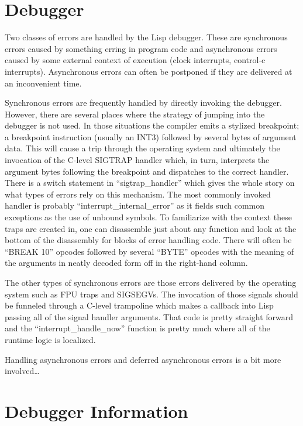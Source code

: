 \chapter{Debugger}
Two classes of errors are handled by the Lisp debugger.  These are
synchronous errors caused by something erring in program code and
asynchronous errors caused by some external context of execution
(clock interrupts, control-c interrupts).  Asynchronous errors can
often be postponed if they are delivered at an inconvenient time.

Synchronous errors are frequently handled by directly invoking the
debugger.  However, there are several places where the strategy of
jumping into the debugger is not used.  In those situations the
compiler emits a stylized breakpoint; a breakpoint instruction
(usually an INT3) followed by several bytes of argument data.  This
will cause a trip through the operating system and ultimately the
invocation of the C-level SIGTRAP handler which, in turn, interprets
the argument bytes following the breakpoint and dispatches to the
correct handler.  There is a switch statement in ``sigtrap\_handler''
which gives the whole story on what types of errors rely on this
mechanism.  The most commonly invoked handler is probably
``interrupt\_internal\_error'' as it fields such common exceptions as
the use of unbound symbols.  To familiarize with the context these
traps are created in, one can disassemble just about any function and
look at the bottom of the disassembly for blocks of error handling code.
There will often be ``BREAK 10'' opcodes followed by several ``BYTE''
opcodes with the meaning of the arguments in neatly decoded form off
in the right-hand column.

The other types of synchronous errors are those errors delivered by
the operating system such as FPU traps and SIGSEGVs.  The invocation
of those signals should be funneled through a C-level trampoline which
makes a callback into Lisp passing all of the signal handler
arguments.  That code is pretty straight forward and the
``interrupt\_handle\_now'' function is pretty much where all of the
runtime logic is localized.

Handling asynchronous errors and deferred asynchronous errors is a bit more
involved\ldots

\chapter{Debugger Information}
\label{debug-info}

